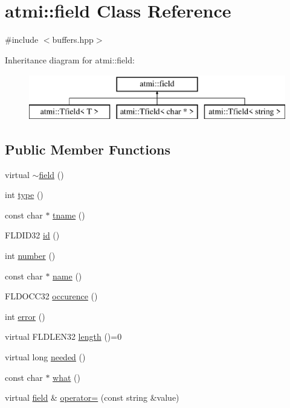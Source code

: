 \hypertarget{classatmi_1_1field}{}\section{atmi\+:\+:field Class Reference}
\label{classatmi_1_1field}


{\ttfamily \#include $<$buffers.\+hpp$>$}

Inheritance diagram for atmi\+:\+:field\+:\begin{figure}[H]
\begin{center}
\leavevmode
\includegraphics[height=2.000000cm]{classatmi_1_1field}
\end{center}
\end{figure}
\subsection*{Public Member Functions}
\begin{DoxyCompactItemize}
\item 
virtual \hyperlink{classatmi_1_1field_a6f91cba3fca0a77fb7ad229187d689b9}{$\sim$field} ()
\item 
int \hyperlink{classatmi_1_1field_a717c701f07a784f471abb44d7bc95048}{type} ()
\item 
const char $\ast$ \hyperlink{classatmi_1_1field_a7d6260dd6f7c3c44de29190c2dfd546e}{tname} ()
\item 
F\+L\+D\+I\+D32 \hyperlink{classatmi_1_1field_a29384f1a15dc298b8fe4a41aa0746430}{id} ()
\item 
int \hyperlink{classatmi_1_1field_aa71d28f3df8490e9ed016607f857fae1}{number} ()
\item 
const char $\ast$ \hyperlink{classatmi_1_1field_a0fbc5a958a0af8286e339b088ee69bc8}{name} ()
\item 
F\+L\+D\+O\+C\+C32 \hyperlink{classatmi_1_1field_a161b9b7037c49fbcf86518fcb35e779c}{occurence} ()
\item 
int \hyperlink{classatmi_1_1field_a6d8db988f58f3779b0ef528a11b3466f}{error} ()
\item 
virtual F\+L\+D\+L\+E\+N32 \hyperlink{classatmi_1_1field_a296771293135085d91aa9aefd108d44d}{length} ()=0
\item 
virtual long \hyperlink{classatmi_1_1field_aef2940ef13d554b2a0090ea4052529d8}{needed} ()
\item 
const char $\ast$ \hyperlink{classatmi_1_1field_a396b41ad5ae2b1df362e446c5f090640}{what} ()
\item 
virtual \hyperlink{classatmi_1_1field}{field} \& \hyperlink{classatmi_1_1field_ac032afae0c1ebfc606f047ce1a32ac58}{operator=} (const string \&value)
\end{DoxyCompactItemize}
